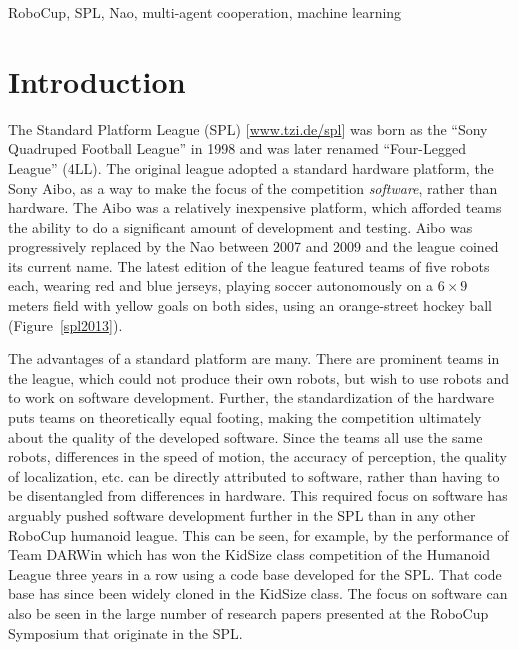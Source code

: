 \documentclass{llncs}
\begin{document}
\begin{keywords}
RoboCup, SPL, Nao, multi-agent cooperation, machine learning
\end{keywords}

\section{Introduction}

The Standard Platform League (SPL) [\url{www.tzi.de/spl}] was born as the ``Sony Quadruped Football League'' in 1998 and was later renamed ``Four-Legged League'' (4LL).
The original league adopted a standard hardware platform, the Sony Aibo, as a way to make the focus
of the competition \textit{software}, rather than hardware. The Aibo was a relatively
inexpensive platform, which afforded teams the ability to do a significant amount of development
and testing. 
Aibo was progressively replaced by the Nao between 2007 and 2009 and the league coined its current name. The latest edition of the league featured teams of five robots each, wearing red and blue jerseys, playing soccer autonomously on a $6\times9$ meters field with yellow goals on both sides, using an orange-street hockey ball (Figure~\ref{spl2013}).

The advantages of a standard platform are many. There are prominent teams
in the league, which could not produce their own robots, but wish to use
robots and to work on software development. Further, the
standardization of the hardware puts teams on theoretically equal footing, making the
competition ultimately about the quality of the developed software. Since the teams all use the
same robots, differences in the speed of motion, the accuracy of perception, the quality of localization, etc. can
be directly attributed to software, rather than having to be disentangled from differences
in hardware.
This required focus on software
has arguably pushed software development further in the SPL than in any other RoboCup humanoid league. This can be seen, for example, by the performance of Team DARWin which has won the KidSize
class competition of the Humanoid League three years in a row using a code base developed for the SPL. That code base
has since been widely cloned in the KidSize class. The focus on software can also be
seen in the large number of research papers presented at the RoboCup Symposium that originate in the
SPL.
\end{document}
